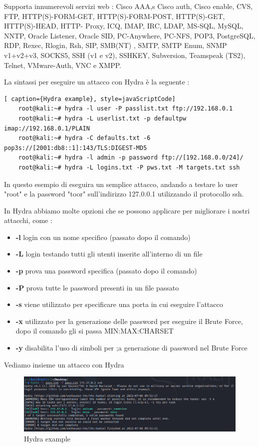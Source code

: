 Supporta innumerevoli servizi web : Cisco AAA,s Cisco auth, Cisco enable, CVS, FTP, HTTP(S)-FORM-GET, HTTP(S)-FORM-POST, HTTP(S)-GET, HTTP(S)-HEAD, HTTP- Proxy, ICQ, IMAP, IRC, LDAP, MS-SQL, MySQL, NNTP, Oracle Listener, Oracle SID, PC-Anywhere, PC-NFS, POP3, PostgreSQL, RDP, Rexec, Rlogin, Rsh, SIP, SMB(NT) , SMTP, SMTP Enum, SNMP v1+v2+v3, SOCKS5, SSH (v1 e v2), SSHKEY, Subversion, Teamspeak (TS2), Telnet, VMware-Auth, VNC e XMPP.

La sintassi per eseguire un attacco con Hydra è la seguente :

\begin{lstlisting}[ caption={Hydra example}, style=javaScriptCode]
    root@kali:~# hydra -l user -P passlist.txt ftp://192.168.0.1
    root@kali:~# hydra -L userlist.txt -p defaultpw imap://192.168.0.1/PLAIN
    root@kali:~# hydra -C defaults.txt -6 pop3s://[2001:db8::1]:143/TLS:DIGEST-MD5
    root@kali:~# hydra -l admin -p password ftp://[192.168.0.0/24]/
    root@kali:~# hydra -L logins.txt -P pws.txt -M targets.txt ssh
\end{lstlisting}

In questo esempio di eseguira un semplice attacco, andando a testare lo user "root" e la password "toor" sull'indirizzo 127.0.0.1 utilizzando il protocollo ssh.

In Hydra abbiamo molte opzioni che se possono applicare per migliorare i nostri attacchi, come :
\begin{itemize}
    \item \textbf{-l} login con un nome specifico (passato dopo il comando)
    \item \textbf{-L} login testando tutti gli utenti inserite all'interno di un file 
    \item \textbf{-p} prova una password specifica (passato dopo il comando)
    \item \textbf{-P} prova tutte le password presenti in un file passato
    \item \textbf{-s} viene utilizzato per specificare una porta in cui eseguire l'attacco 
    \item \textbf{-x} utilizzato per la generazione delle password per eseguire il Brute Force, dopo il comando gli si passa MIN:MAX:CHARSET
    \item \textbf{-y} disabilita l'uso di simboli per ;a generazione di password nel Brute Force
\end{itemize}

Vediamo insieme un attacco con Hydra 

\begin{figure}[htpb!]
    \centering
    \includegraphics[width=\linewidth]{Immagini/5/hydra.png}
    \caption{Hydra example}
    \label{fig:Hydra example}
\end{figure}

